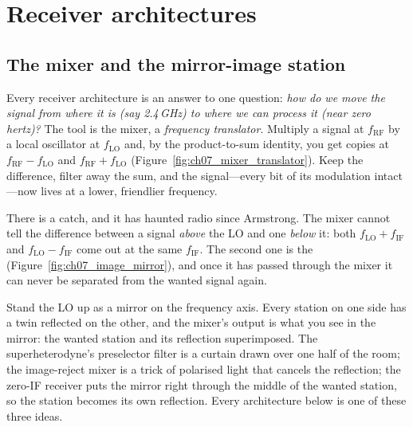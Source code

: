 \section{Receiver architectures}
\label{sec:ch07:arch}

\subsection{The mixer and the mirror-image station}

Every receiver architecture is an answer to one question: \emph{how do we move the signal from where
it is (say 2.4\,GHz) to where we can process it (near zero hertz)?} The tool is the mixer, a
\emph{frequency translator}. Multiply a signal at $f_{\text{RF}}$ by a local oscillator at
$f_{\text{LO}}$ and, by the product-to-sum identity, you get copies at $f_{\text{RF}}-f_{\text{LO}}$
and $f_{\text{RF}}+f_{\text{LO}}$ (Figure~\ref{fig:ch07_mixer_translator}). Keep the difference, filter
away the sum, and the signal---every bit of its modulation intact---now lives at a lower,
friendlier frequency.


There is a catch, and it has haunted radio since Armstrong. The mixer cannot tell the difference
between a signal \emph{above} the LO and one \emph{below} it: both $f_{\text{LO}}+f_{\text{IF}}$ and
$f_{\text{LO}}-f_{\text{IF}}$ come out at the same $f_{\text{IF}}$. The second one is the 
(Figure~\ref{fig:ch07_image_mirror}), and once it has passed through the mixer it can never be
separated from the wanted signal again.

\begin{analogy}
Stand the LO up as a mirror on the frequency axis. Every station on one side has a twin reflected on
the other, and the mixer's output is what you see in the mirror: the wanted station and its reflection
superimposed. The superheterodyne's preselector filter is a curtain drawn over one half of the room;
the image-reject mixer is a trick of polarised light that cancels the reflection; the zero-IF receiver
puts the mirror right through the middle of the wanted station, so the station becomes its own
reflection. Every architecture below is one of these three ideas.
\end{analogy}

